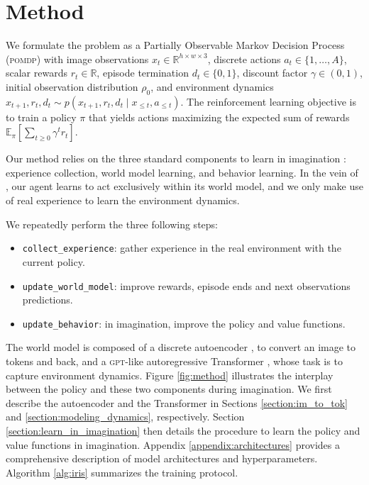 \section{Method}
\label{sec:method}



We formulate the problem as a Partially Observable Markov Decision Process (\textsc{pomdp}) with image observations $x_t \in \mathbb{R}^{h \times w \times 3}$, discrete actions $a_t \in \{1, \dots, A\}$, scalar rewards $r_t \in \mathbb{R}$, episode termination $d_t \in \{0, 1\}$, discount factor $\gamma \in (0, 1)$, initial observation distribution $\rho_0$, and environment dynamics $x_{t+1}, r_t, d_t \sim p(x_{t+1}, r_t, d_t \mid x_{\le t}, a_{\le t})$. The reinforcement learning objective is to train a policy $\pi$ that yields actions maximizing the expected sum of rewards $\mathbb{E}_\pi[\sum_{t \ge 0} \gamma^t r_t]$.

Our method relies on the three standard components to learn in imagination \citep{sutton}: experience collection, world model learning, and behavior learning. In the vein of \citet{worldmodels, simple, dreamerv1, dreamerv2}, our agent learns to act exclusively within its world model, and we only make use of real experience to learn the environment dynamics.

We repeatedly perform the three following steps: 
\begin{itemize}[left=1em]
    \setlength\itemsep{0.5em}
    \item \texttt{collect\_experience}: gather experience in the real environment with the current policy. 
    \item \texttt{update\_world\_model}: improve rewards, episode ends and next observations predictions.
    \item \texttt{update\_behavior}: in imagination, improve the policy and value functions. 
\end{itemize}

The world model is composed of a discrete autoencoder \citep{vqvae}, to convert an image to tokens and back, and a \textsc{gpt}-like autoregressive Transformer \citep{vaswani, radford_gpt2, brown_gpt3}, whose task is to capture environment dynamics. Figure \ref{fig:method} illustrates the interplay between the policy and these two components during imagination. We first describe the autoencoder and the Transformer in Sections \ref{section:im_to_tok} and \ref{section:modeling_dynamics}, respectively. Section \ref{section:learn_in_imagination} then details the procedure to learn the policy and value functions in imagination. Appendix \ref{appendix:architectures} provides a comprehensive description of model architectures and hyperparameters. Algorithm \ref{alg:iris} summarizes the training protocol.

